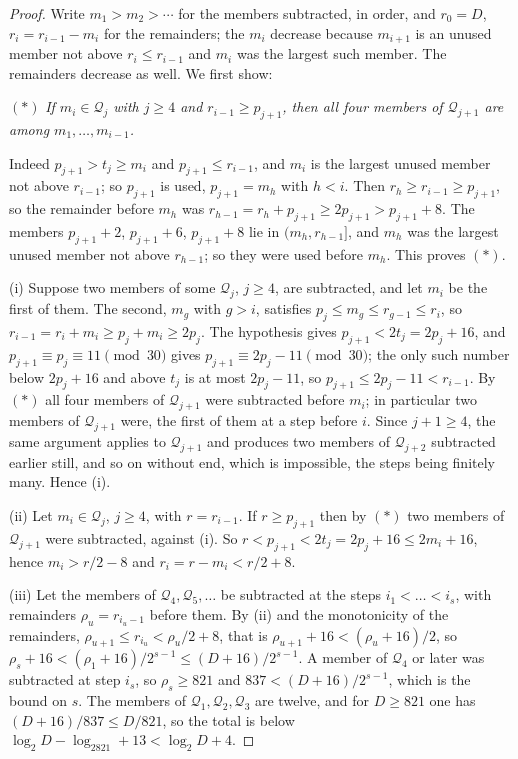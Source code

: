 \documentclass[11pt,a4paper]{article}
\newcommand{\Q}{\mathcal{Q}}
\begin{document}
\begin{proof}
Write $m_1>m_2>\cdots$ for the members subtracted, in order, and
$r_0=D$, $r_i=r_{i-1}-m_i$ for the remainders; the $m_i$ decrease because
$m_{i+1}$ is an unused member not above $r_i\le r_{i-1}$ and $m_i$ was the
largest such member. The remainders decrease as well. We first show:

\smallskip\noindent
$(\ast)$ \emph{If $m_i\in\Q_j$ with $j\ge4$ and $r_{i-1}\ge p_{j+1}$,
then all four members of $\Q_{j+1}$ are among $m_1,\dots,m_{i-1}$.}

\smallskip\noindent
Indeed $p_{j+1}>t_j\ge m_i$ and $p_{j+1}\le r_{i-1}$, and $m_i$ is the
largest unused member not above $r_{i-1}$; so $p_{j+1}$ is used,
$p_{j+1}=m_h$ with $h<i$. Then $r_h\ge r_{i-1}\ge p_{j+1}$, so the
remainder before $m_h$ was $r_{h-1}=r_h+p_{j+1}\ge2p_{j+1}>p_{j+1}+8$. The
members $p_{j+1}+2$, $p_{j+1}+6$, $p_{j+1}+8$ lie in $(m_h,r_{h-1}]$, and
$m_h$ was the largest unused member not above $r_{h-1}$; so they were used
before $m_h$. This proves $(\ast)$.

(i) Suppose two members of some $\Q_j$, $j\ge4$, are subtracted, and let
$m_i$ be the first of them. The second, $m_g$ with $g>i$, satisfies
$p_j\le m_g\le r_{g-1}\le r_i$, so $r_{i-1}=r_i+m_i\ge p_j+m_i\ge2p_j$.
The hypothesis gives $p_{j+1}<2t_j=2p_j+16$, and $p_{j+1}\equiv
p_j\equiv11\pmod{30}$ gives $p_{j+1}\equiv2p_j-11\pmod{30}$; the
only such number below $2p_j+16$ and above $t_j$ is at most $2p_j-11$, so
$p_{j+1}\le2p_j-11<r_{i-1}$. By $(\ast)$ all four members of $\Q_{j+1}$
were subtracted before $m_i$; in particular two members of $\Q_{j+1}$
were, the first of them at a step before $i$. Since $j+1\ge4$, the same
argument applies to $\Q_{j+1}$ and produces two members of $\Q_{j+2}$
subtracted earlier still, and so on without end, which is impossible, the
steps being finitely many. Hence (i).

(ii) Let $m_i\in\Q_j$, $j\ge4$, with $r=r_{i-1}$. If $r\ge p_{j+1}$ then
by $(\ast)$ two members of $\Q_{j+1}$ were subtracted, against (i). So
$r<p_{j+1}<2t_j=2p_j+16\le2m_i+16$, hence $m_i>r/2-8$ and
$r_i=r-m_i<r/2+8$.

(iii) Let the members of $\Q_4,\Q_5,\dots$ be subtracted at the steps
$i_1<\dots<i_s$, with remainders $\rho_u=r_{i_u-1}$ before them. By (ii)
and the monotonicity of the remainders, $\rho_{u+1}\le r_{i_u}<\rho_u/2+8$,
that is $\rho_{u+1}+16<(\rho_u+16)/2$, so
$\rho_s+16<(\rho_1+16)/2^{s-1}\le(D+16)/2^{s-1}$. A member of $\Q_4$ or
later was subtracted at step $i_s$, so $\rho_s\ge821$ and
$837<(D+16)/2^{s-1}$, which is the bound on $s$. The members of
$\Q_1,\Q_2,\Q_3$ are twelve, and for $D\ge821$ one has
$(D+16)/837\le D/821$, so the total is below
$\log_2D-\log_2821+13<\log_2D+4$.
\end{proof}
\end{document}
